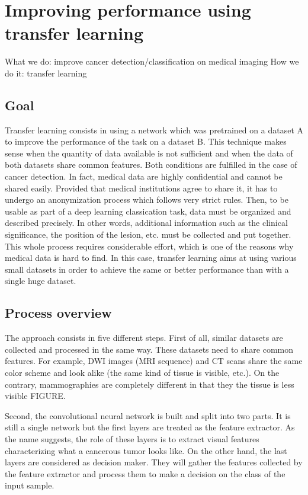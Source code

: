 
\chapter{Improving performance using transfer learning}
\label{ch:transfer_learning}

What we do: improve cancer detection/classification on medical imaging
How we do it: transfer learning

\section{Goal}
Transfer learning consists in using a network which was pretrained on a dataset A to improve the performance of the task on a dataset B. This technique makes sense when the quantity of data available is not sufficient and when the data of both datasets share common features. Both conditions are fulfilled in the case of cancer detection. In fact, medical data are highly confidential and cannot be shared easily. Provided that medical institutions agree to share it, it has to undergo an anonymization process which follows very strict rules. Then, to be usable as part of a deep learning classication task, data must be organized and described precisely. In other words, additional information such as the clinical significance, the position of the lesion, etc. must be collected and put together. This whole process requires considerable effort, which is one of the reasons why medical data is hard to find. In this case, transfer learning aims at using various small datasets in order to achieve the same or better performance than with a single huge dataset. 


\section{Process overview}
The approach consists in five different steps.
First of all, similar datasets are collected and processed in the same way. These datasets need to share common features. For example, DWI images (MRI sequence) and CT scans share the same color scheme and look alike (the same kind of tissue is visible, etc.). On the contrary, mammographies are completely different in that they the tissue is less visible FIGURE. 

Second, the convolutional neural network is built and split into two parts. It is still a single network but the first layers are treated as the feature extractor. As the name suggests, the role of these layers is to extract visual features characterizing what a cancerous tumor looks like. On the other hand, the last layers are considered as decision maker. They will gather the features collected by the feature extractor and process them to make a decision on the class of the input sample. 

